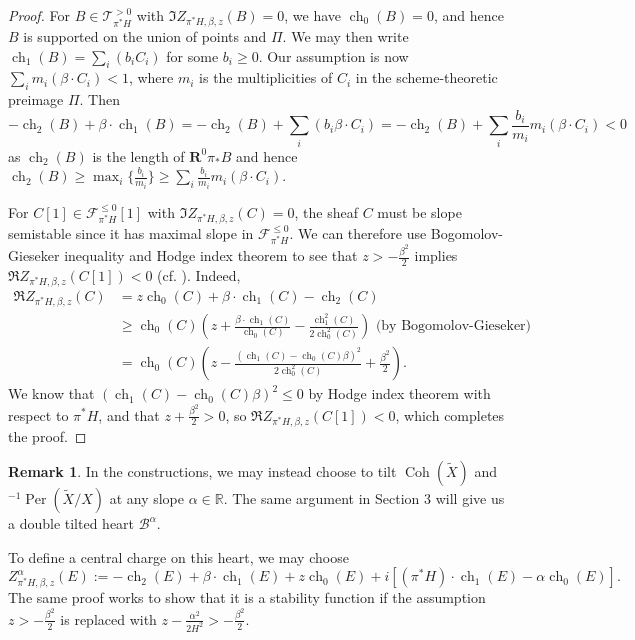 \documentclass[12pt]{amsart}
\theoremstyle{definition}
\newtheorem{remark}[theorem]{Remark}
\DeclareMathOperator{\Coh}{Coh}
\DeclareMathOperator{\ch}{ch}
\DeclareMathOperator{\Per}{Per}
\begin{document}
\begin{proof}
For $B \in \mathcal{T}^{> 0}_{\pi^\ast H}$ with $\Im Z_{\pi^\ast H,\beta,z}(B)=0$, we have $\ch_0(B)=0$, and hence $B$ is supported on the union of points and $\Pi$. 
We may then write 
$\ch_1(B) = \displaystyle \sum_i (b_iC_i)$ for some $b_i \geq 0$.
Our assumption is now $\displaystyle \sum_i m_i( \beta \cdot C_i) <1$,  where $m_i$ is the multiplicities of $C_i$ in the scheme-theoretic preimage $\Pi$.
Then \[-\ch_2(B)+\beta \cdot \ch_1(B) = -\ch_2(B) + \displaystyle \sum_i(b_i \beta \cdot C_i)=-\ch_2(B) + \displaystyle \sum_i \frac{b_i}{m_i} m_i(\beta \cdot C_i)<0\]
as $\ch_2(B)$ is the length of $\mathbf{R}^0\pi_\ast B$ and hence $ \ch_2(B)\geq \displaystyle\max_i \{\frac{b_i}{m_i}\} \geq \displaystyle \sum_i \frac{b_i}{m_i} m_i(\beta \cdot C_i)$.

For $C[1] \in \mathcal{F}^{\leq 0}_{\pi^\ast H}[1]$ with $\Im Z_{\pi^\ast H,\beta,z}(C)=0$, the sheaf $C$ must be slope semistable since it has maximal slope in $\mathcal{F}^{\leq 0}_{\pi^\ast H}$.
We can therefore use Bogomolov-Gieseker inequality and Hodge index theorem to see that $z>-\frac{\beta^2}{2}$ implies $\Re Z_{\pi^\ast H,\beta,z}(C[1])<0$ (cf. \cite[Lemma 5.2]{TX22}).
Indeed,
\begin{equation*} 
\begin{split}
\Re  Z_{\pi^\ast H,\beta,z}(C)  &= z\ch_0(C)+\beta \cdot \ch_1(C) - \ch_2(C) \\
&\geq \ch_0(C)(z+ \frac{\beta \cdot \ch_1(C)}{\ch_0(C)} - \frac{\ch_1^2(C)}{2\ch_0^2(C)}) \text{\ (by Bogomolov-Gieseker)}\\
&= \ch_0(C)(z- \frac{(\ch_1(C) -\ch_0(C)\beta)^2}{2\ch_0^2(C)}  +\frac{\beta^2}{2}).
\end{split}
\end{equation*}
We know that $(\ch_1(C) -\ch_0(C)\beta)^2 \leq 0$ by Hodge index theorem with respect to $\pi^\ast H$,
and that $z+\frac{\beta^2}{2}>0$,
so $\Re  Z_{\pi^\ast H,\beta,z}(C[1])<0$, which completes the proof.
\end{proof}

\begin{remark}
In the constructions, we may instead choose to tilt $\Coh(\widetilde{X})$ and $^{-1}\Per(\widetilde{X}/X)$ at any slope $\alpha \in \mathbb{R}$.
The same argument in Section 3 will give us a double tilted heart $\mathcal{B}^\alpha$.

To define a central charge on this heart, we may choose $$Z_{\pi^\ast H,\beta,z}^\alpha(E):=-\ch_2(E)+\beta \cdot \ch_1(E)+z\ch_0(E)+i[(\pi^\ast H)\cdot \ch_1(E) - \alpha \ch_0(E)].$$
The same proof works to show that it is a stability function if the assumption $z> -\frac{\beta^2}{2}$ is replaced with $z - \frac{\alpha^2}{2H^2}> -\frac{\beta^2}{2}$. 
\end{remark}
\end{document}
